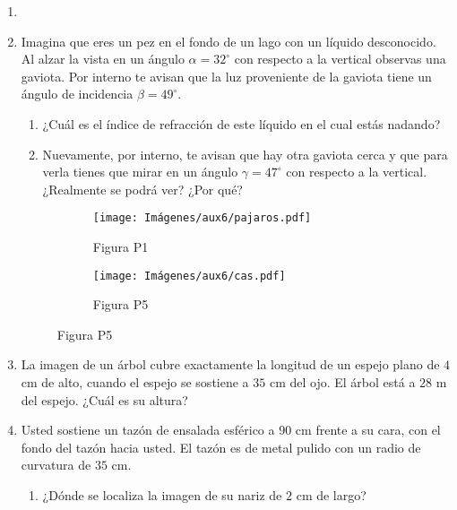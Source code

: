 \documentclass[letterpaper,11pt]{article}
\begin{document}
\vspace{-1cm}
\begin{enumerate}\setlength{\itemsep}{0.4cm}


\item[]

\item Imagina que eres un pez en el fondo de un lago con un líquido desconocido. Al alzar la vista en un ángulo $\alpha = 32^{\circ}$ con respecto a la vertical observas una gaviota. Por interno te avisan que la luz proveniente de la gaviota tiene un ángulo de incidencia $\beta = 49^{\circ}$.

\begin{enumerate}
    \item ¿Cuál es el índice de refracción de este líquido en el cual estás nadando?
    
    \item Nuevamente, por interno, te avisan que hay otra gaviota cerca y que para verla tienes que mirar en un ángulo $\gamma = 47^{\circ}$ con respecto a la vertical. ¿Realmente se podrá ver? ¿Por qué?
\end{enumerate}

\begin{figure}[H]
    \centering
    \begin{subfigure}[t]{0.5\textwidth}
        \centering
        \texttt{[image: Imágenes/aux6/pajaros.pdf]}
        \caption*{Figura P1}
    \end{subfigure}
    \hspace{0.5cm}
    \begin{subfigure}[t]{0.4\textwidth}
        \centering
        \texttt{[image: Imágenes/aux6/cas.pdf]}
        \caption*{Figura P5}
    \end{subfigure}
\end{figure}

\item La imagen de un árbol cubre exactamente la longitud de un espejo plano de $4$ cm de alto, cuando el espejo se sostiene a $35$ cm del ojo. El árbol está a $28$ m del espejo. ¿Cuál es su altura?

\item Usted sostiene un tazón de ensalada esférico a $90$ cm frente a su cara, con el fondo del tazón hacia usted. El tazón es de metal pulido con un radio de curvatura de $35$ cm.

\begin{enumerate}
    \item ¿Dónde se localiza la imagen de su nariz de $2$ cm de largo?
    

\end{enumerate}
\end{enumerate}
\end{document}
